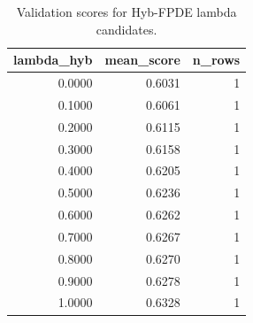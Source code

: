 \begin{table}[t]
\caption{Validation scores for Hyb-FPDE lambda candidates.}
\label{tab:lambda_distribution_computed}
\centering
\begin{tabular}{rrr}
\toprule
lambda\_hyb & mean\_score & n\_rows \\
\midrule
0.0000 & 0.6031 & 1 \\
0.1000 & 0.6061 & 1 \\
0.2000 & 0.6115 & 1 \\
0.3000 & 0.6158 & 1 \\
0.4000 & 0.6205 & 1 \\
0.5000 & 0.6236 & 1 \\
0.6000 & 0.6262 & 1 \\
0.7000 & 0.6267 & 1 \\
0.8000 & 0.6270 & 1 \\
0.9000 & 0.6278 & 1 \\
1.0000 & 0.6328 & 1 \\
\bottomrule
\end{tabular}

\end{table}
